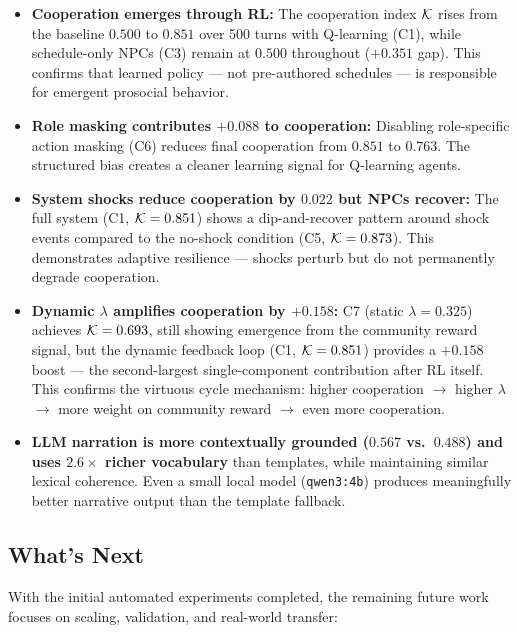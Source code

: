 \begin{itemize}
    \item \textbf{Cooperation emerges through RL:} The cooperation index $\mathcal{K}$ rises from the baseline $0.500$ to $0.851$ over 500 turns with Q-learning (C1), while schedule-only NPCs (C3) remain at $0.500$ throughout ($+0.351$ gap). This confirms that learned policy --- not pre-authored schedules --- is responsible for emergent prosocial behavior.

    \item \textbf{Role masking contributes $+0.088$ to cooperation:} Disabling role-specific action masking (C6) reduces final cooperation from $0.851$ to $0.763$. The structured bias creates a cleaner learning signal for Q-learning agents.

    \item \textbf{System shocks reduce cooperation by $0.022$ but NPCs recover:} The full system (C1, $\mathcal{K} = 0.851$) shows a dip-and-recover pattern around shock events compared to the no-shock condition (C5, $\mathcal{K} = 0.873$). This demonstrates adaptive resilience --- shocks perturb but do not permanently degrade cooperation.

    \item \textbf{Dynamic $\lambda$ amplifies cooperation by $+0.158$:} C7 (static $\lambda = 0.325$) achieves $\mathcal{K} = 0.693$, still showing emergence from the community reward signal, but the dynamic feedback loop (C1, $\mathcal{K} = 0.851$) provides a $+0.158$ boost --- the second-largest single-component contribution after RL itself. This confirms the virtuous cycle mechanism: higher cooperation $\to$ higher $\lambda$ $\to$ more weight on community reward $\to$ even more cooperation.

    \item \textbf{LLM narration is more contextually grounded ($0.567$ vs.\ $0.488$) and uses $2.6\times$ richer vocabulary} than templates, while maintaining similar lexical coherence. Even a small local model (\texttt{qwen3:4b}) produces meaningfully better narrative output than the template fallback.
\end{itemize}

\subsection{What's Next}

With the initial automated experiments completed, the remaining future work focuses on scaling, validation, and real-world transfer:

